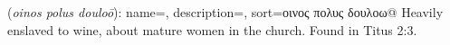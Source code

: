 \item[Wine enslavement (heavy),]

(\textit{oinos polus douloō}):
{
    name=,
    description={},
    sort=οινος πολυς δουλοω@
}
Heavily enslaved to wine, about mature women in the church.
Found in Titus 2:3.
